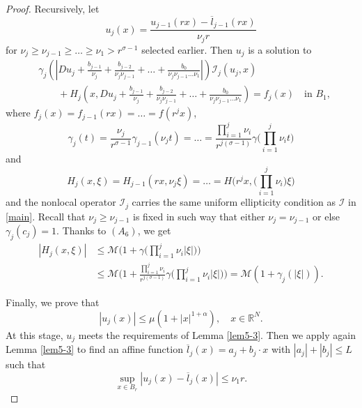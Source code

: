 \documentclass[11pt,reqno]{amsart}
\numberwithin{equation}{section}
\begin{document}
\begin{proof}
Recursively, let
$$
u_j(x)=\frac{u_{j-1}(rx)-\overline{l}_{j-1}(rx)}{\nu_jr}
$$
for $\nu_j\ge\nu_{j-1}\ge\dots\ge\nu_1>r^{\sigma-1}$ selected earlier. Then $u_j$ is a solution to
\begin{align*}
&\gamma_j\left(\left|Du_j+\frac{b_{j-1}}{\nu_j}+\frac{b_{j-2}}{\nu_j\nu_{j-1}}+\dots+\frac{b_0}{\nu_j\nu_{j-1}\dots\nu_1}\right|\right)
\mathcal{I}_j(u_j,x)\\
&\qquad+H_j\left(x,Du_j+\frac{b_{j-1}}{\nu_j}+\frac{b_{j-2}}{\nu_j\nu_{j-1}}+\dots+\frac{b_0}{\nu_j\nu_{j-1}\dots\nu_1}\right)=f_j(x) \quad\text{in } B_1,
\end{align*}
where $f_j(x)=f_{j-1}(rx)=\dots=f(r^jx)$,
$$
\gamma_j(t)=\frac{\nu_j}{r^{\sigma-1}}\gamma_{j-1}(\nu_jt)=\dots=\frac{\prod^j_{i=1}\nu_i}{r^{j(\sigma-1)}}\gamma\biggl(\prod^j_{i=1}\nu_it\biggr)
$$
and
$$
 H_j(x,\xi)=H_{j-1}(rx,\nu_j\xi)=\dots=H\biggl(r^jx,\biggl(\prod^j_{i=1}\nu_i\biggr)\xi\biggr)
$$
and the nonlocal operator $\mathcal{I}_j$ carries the same uniform ellipticity condition as $\mathcal{I}$ in \eqref{main}. Recall that $\nu_j\ge\nu_{j-1}$ is fixed in such way that either $\nu_j=\nu_{j-1}$ or else $\gamma_j(c_j)=1$. Thanks to $(A_6)$, we get
\begin{align*}
|H_j(x,\xi)|&\le \mathcal{M}\biggl(1+\gamma\biggl(\prod^j_{i=1}\nu_i|\xi|\biggr)\biggr)\\
&\le\mathcal{M}\biggl(1+\frac{\prod^j_{i=1}\nu_i}{r^{j(\sigma-1)}}\gamma\biggl(\prod^j_{i=1}\nu_i|\xi|\biggr)\biggr)
=\mathcal{M}(1+\gamma_j(|\xi|)).
\end{align*}

Finally, we prove that
\begin{equation}
\label{5-4-1}
|u_j(x)|\le \mu(1+|x|^{1+\alpha}), \quad x\in\mathbb{R}^N.
\end{equation}
At this stage, $u_j$ meets the requirements of Lemma \ref{lem5-3}. Then we apply again Lemma \ref{lem5-3} to find an affine function  $\overline{l}_j(x)=a_j+b_j\cdot x$ with $|a_j|+|b_j|\le L$ such that
\begin{equation}
\label{5-4-2}
\sup_{x\in B_{r}}|u_j(x)-\overline{l}_j(x)|\leq \nu_1r.
\end{equation}


\end{proof}
\end{document}
